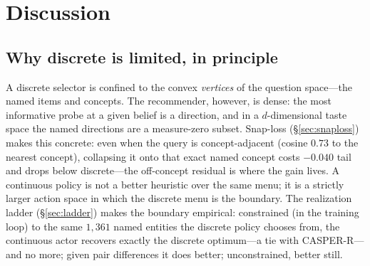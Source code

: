 \documentclass[11pt]{article}
\begin{document}
\section{Discussion}\label{sec:discussion}
\subsection{Why discrete is limited, in principle}
A discrete selector is confined to the convex \emph{vertices} of the question space---the named items and concepts. The
recommender, however, is dense: the most informative probe at a given belief is a direction, and in a $d$-dimensional
taste space the named directions are a measure-zero subset. Snap-loss (\S\ref{sec:snaploss}) makes this concrete: even
when the query is concept-adjacent (cosine $0.73$ to the nearest concept), collapsing it onto that exact named concept
costs $-0.040$ tail and drops below discrete---the off-concept residual is where the gain lives. A continuous policy is
not a better heuristic over the same menu; it is a strictly larger action space in which the discrete menu is the
boundary. The realization ladder (\S\ref{sec:ladder}) makes the boundary empirical: constrained (in the training loop)
to the same $1{,}361$ named entities the discrete policy chooses from, the continuous actor recovers exactly the
discrete optimum---a tie with CASPER-R---and no more; given pair differences it does better; unconstrained, better
still.
\end{document}
